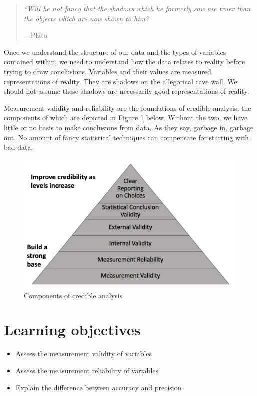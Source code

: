 \documentclass[
]{book}
\providecommand{\tightlist}{%
  \setlength{\itemsep}{0pt}\setlength{\parskip}{0pt}}
\begin{document}
\begin{quote}
\emph{``Will he not fancy that the shadows which he formerly saw are truer than the objects which are now shown to him?}

---Plato
\end{quote}

Once we understand the structure of our data and the types of variables contained within, we need to understand how the data relates to reality before trying to draw conclusions. Variables and their values are measured representations of reality. They are shadows on the allegorical cave wall. We should not assume these shadows are necessarily good representations of reality.

Measurement validity and reliability are the foundations of credible analysis, the components of which are depicted in Figure \ref{fig:credfig} below. Without the two, we have little or no basis to make conclusions from data. As they say, garbage in, garbage out. No amount of fancy statistical techniques can compensate for starting with bad data.

\begin{figure}

{\centering \includegraphics[width=\textwidth]{images/credible} 

}

\caption{Components of credible analysis}\label{fig:credfig}
\end{figure}

\hypertarget{lo3}{%
\section{Learning objectives}\label{lo3}}

\begin{itemize}
\tightlist
\item
  Assess the measurement validity of variables
\item
  Assess the measurement reliability of variables
\item
  Explain the difference between accuracy and precision
\end{itemize}
\end{document}
